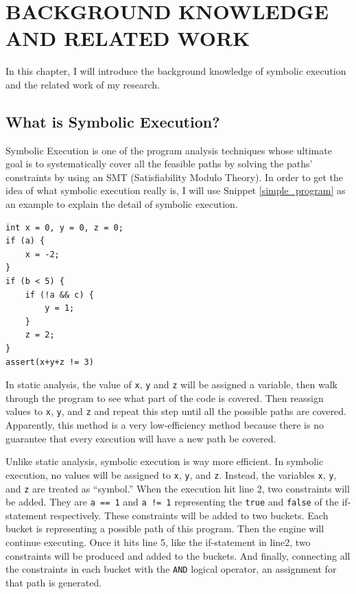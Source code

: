 \chapter{BACKGROUND KNOWLEDGE AND RELATED WORK}
In this chapter, I will introduce the background knowledge of symbolic execution and the related work of my research.
\section{What is Symbolic Execution?}

Symbolic Execution is one of the program analysis techniques whose ultimate goal is to systematically cover all the feasible paths by solving the paths' constraints by using an SMT (Satisfiability Modulo Theory). In order to get the idea of what symbolic execution really is, I will use Snippet \ref{simple_program} as an example to explain the detail of symbolic execution.
\pagebreak
\begin{spacing}{1}
{
\begin{lstlisting}[frame=shadowbox, caption={A Simple Program},label={simple_program}]
int x = 0, y = 0, z = 0;
if (a) {
    x = -2;
}
if (b < 5) {
    if (!a && c) {
        y = 1;
    }
    z = 2;
}
assert(x+y+z != 3)
\end{lstlisting}
}
\end{spacing}

In static analysis, the value of \texttt{x}, \texttt{y} and \texttt{z} will be assigned a variable, then walk through the program to see what part of the code is covered. Then reassign values to \texttt{x}, \texttt{y}, and \texttt{z} and repeat this step until all the possible paths are covered. Apparently, this method is a very low-efficiency method because there is no guarantee that every execution will have a new path be covered. 

Unlike static analysis, symbolic execution is way more efficient. In symbolic execution, no values will be assigned to \texttt{x}, \texttt{y}, and \texttt{z}. Instead, the variables \texttt{x}, \texttt{y}, and \texttt{z} are treated as ``symbol.'' When the execution hit line 2, two constraints will be added. They are \texttt{a == 1} and \texttt{a != 1} representing the \texttt{true} and \texttt{false} of the if-statement respectively. These constraints will be added to two buckets. Each bucket is representing a possible path of this program. Then the engine will continue executing. Once it hits line 5, like the if-statement in line2, two constraints will be produced and added to the buckets. And finally, connecting all the constraints in each bucket with the \texttt{AND} logical operator, an assignment for that path is generated.

